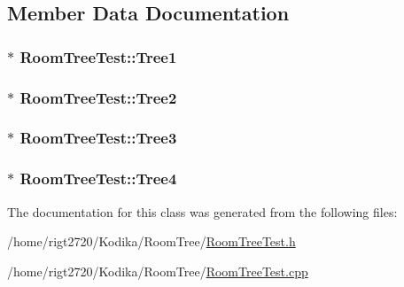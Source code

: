 \subsection{Member Data Documentation}
\hypertarget{classRoomTreeTest_aba5c37d20a82bff695de4c78a547f23f}{
\subsubsection[{Tree1}]{$\ast$ Room\-Tree\-Test\-::\-Tree1\hspace{0.3cm}{\ttfamily [private]}}}\label{classRoomTreeTest_aba5c37d20a82bff695de4c78a547f23f}
\hypertarget{classRoomTreeTest_aada805154b8f5306805936f0ba43834c}{
\subsubsection[{Tree2}]{$\ast$ Room\-Tree\-Test\-::\-Tree2\hspace{0.3cm}{\ttfamily [private]}}}\label{classRoomTreeTest_aada805154b8f5306805936f0ba43834c}
\hypertarget{classRoomTreeTest_aa70878ec1fa44e95f78e59a236572b27}{
\subsubsection[{Tree3}]{$\ast$ Room\-Tree\-Test\-::\-Tree3\hspace{0.3cm}{\ttfamily [private]}}}\label{classRoomTreeTest_aa70878ec1fa44e95f78e59a236572b27}
\hypertarget{classRoomTreeTest_afaaf16b5f57fc43c3e265dca242af31e}{
\subsubsection[{Tree4}]{$\ast$ Room\-Tree\-Test\-::\-Tree4\hspace{0.3cm}{\ttfamily [private]}}}\label{classRoomTreeTest_afaaf16b5f57fc43c3e265dca242af31e}


The documentation for this class was generated from the following files\-:\begin{DoxyCompactItemize}
\item 
/home/rigt2720/\-Kodika/\-Room\-Tree/\hyperlink{RoomTreeTest_8h}{Room\-Tree\-Test.\-h}\item 
/home/rigt2720/\-Kodika/\-Room\-Tree/\hyperlink{RoomTreeTest_8cpp}{Room\-Tree\-Test.\-cpp}\end{DoxyCompactItemize}
